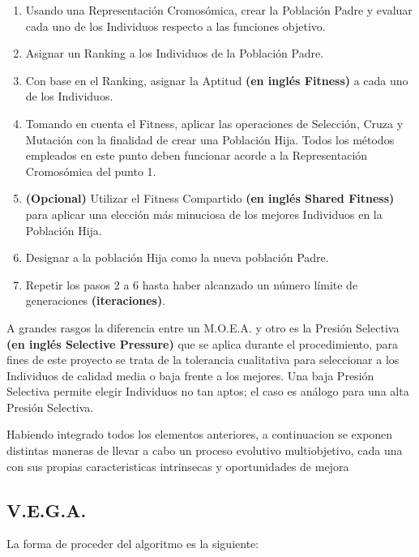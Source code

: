 \documentclass[class=report, crop=false]{standalone}
\begin{document}
\begin{enumerate}[1.]
\item Usando una Representación Cromosómica, crear la Población Padre y evaluar cada uno de los Individuos respecto a las funciones objetivo.

\item Asignar un Ranking a los Individuos de la Población Padre.  

\item Con base en el Ranking, asignar la Aptitud \textbf{(en inglés Fitness)} a cada uno de los Individuos.

\item Tomando en cuenta el Fitness, aplicar las operaciones de Selección, Cruza y Mutación con la finalidad de crear una Población Hija. Todos los métodos empleados en este punto deben funcionar acorde a la Representación Cromosómica del punto 1.

\item \textbf{(Opcional)} Utilizar el Fitness Compartido \textbf{(en inglés Shared Fitness)} para aplicar una elección más minuciosa de los mejores Individuos en la Población Hija. 

\item Designar a la población Hija como la nueva población Padre.

\item Repetir los pasos 2 a 6 hasta haber alcanzado un número límite de generaciones \textbf{(iteraciones)}. 
\end{enumerate}

A grandes rasgos la diferencia entre un M.O.E.A. y otro es la Presión Selectiva 
\textbf{(en inglés Selective Pressure)} que se aplica durante el procedimiento, para fines de este proyecto
se trata de la tolerancia cualitativa para seleccionar a los Individuos de calidad media o baja frente a los
mejores. Una baja Presión Selectiva permite elegir Individuos no tan aptos; el caso es análogo para
una alta Presión Selectiva.

Habiendo integrado todos los elementos anteriores, a continuacion se exponen distintas maneras de llevar
a cabo un proceso evolutivo multiobjetivo, cada una con sus propias caracteristicas intrinsecas y oportunidades de mejora 


\subsection{V.E.G.A.}
La forma de proceder del algoritmo es la siguiente:
\end{document}
